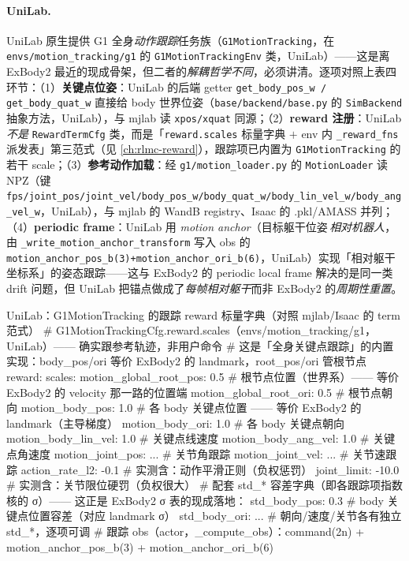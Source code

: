 \paragraph{UniLab.}
UniLab 原生提供 G1 全身\emph{动作跟踪}任务族（\texttt{G1MotionTracking}，在 \texttt{envs/motion\_tracking/g1} 的 \texttt{G1MotionTrackingEnv} 类，UniLab）——这是离 ExBody2 最近的现成骨架，但二者的\emph{解耦哲学不同}，必须讲清。逐项对照上表四环节：（1）\textbf{关键点位姿}：UniLab 的后端 getter \verb|get_body_pos_w / get_body_quat_w| 直接给 body 世界位姿（\texttt{base/backend/base.py} 的 \texttt{SimBackend} 抽象方法，UniLab），与 mjlab 读 \verb|xpos/xquat| 同源；（2）\textbf{reward 注册}：UniLab \emph{不是} \texttt{RewardTermCfg} 类，而是「\texttt{reward.scales} 标量字典 $+$ env 内 \verb|_reward_fns| 派发表」第三范式（见 \cref{ch:rlmc-reward}），跟踪项已内置为 \texttt{G1MotionTracking} 的若干 scale；（3）\textbf{参考动作加载}：经 \texttt{g1/motion\_loader.py} 的 \verb|MotionLoader| 读 NPZ（键 \verb|fps/joint_pos/joint_vel/body_pos_w/body_quat_w/body_lin_vel_w/body_ang_vel_w|，UniLab），与 mjlab 的 WandB registry、Isaac 的 .pkl/AMASS 并列；（4）\textbf{periodic frame}：UniLab 用 \emph{motion anchor}（目标躯干位姿\,\emph{相对机器人}，由 \verb|_write_motion_anchor_transform| 写入 obs 的 \verb|motion_anchor_pos_b(3)+motion_anchor_ori_b(6)|，UniLab）实现「相对躯干坐标系」的姿态跟踪——这与 ExBody2 的 periodic local frame 解决的是同一类 drift 问题，但 UniLab 把锚点做成了\emph{每帧相对躯干}而非 ExBody2 的\emph{周期性重置}。

\begin{codebox}[Python]{UniLab：G1MotionTracking 的跟踪 reward 标量字典（对照 mjlab/Isaac 的 term 范式）}
# G1MotionTrackingCfg.reward.scales（envs/motion_tracking/g1，UniLab）—— 确实跟参考轨迹，非用户命令
# 这是「全身关键点跟踪」的内置实现：body_pos/ori 等价 ExBody2 的 landmark，root_pos/ori 管根节点
reward:
  scales:
    motion_global_root_pos: 0.5      # 根节点位置（世界系）—— 等价 ExBody2 的 velocity 那一路的位置端
    motion_global_root_ori: 0.5      # 根节点朝向
    motion_body_pos: 1.0             # 各 body 关键点位置 —— 等价 ExBody2 的 landmark（主导梯度）
    motion_body_ori: 1.0             # 各 body 关键点朝向
    motion_body_lin_vel: 1.0         # 关键点线速度
    motion_body_ang_vel: 1.0         # 关键点角速度
    motion_joint_pos: ...            # 关节角跟踪
    motion_joint_vel: ...            # 关节速跟踪
    action_rate_l2: -0.1             # 实测含：动作平滑正则（负权惩罚）
    joint_limit: -10.0               # 实测含：关节限位硬罚（负权很大）
  # 配套 std_* 容差字典（即各跟踪项指数核的 σ）—— 这正是 ExBody2 σ 表的现成落地：
  std_body_pos: 0.3                  # body 关键点位置容差（对应 landmark σ）
  std_body_ori: ...                  # 朝向/速度/关节各有独立 std_*，逐项可调
# 跟踪 obs（actor，_compute_obs）：command(2n) + motion_anchor_pos_b(3) + motion_anchor_ori_b(6)
\end{codebox}

